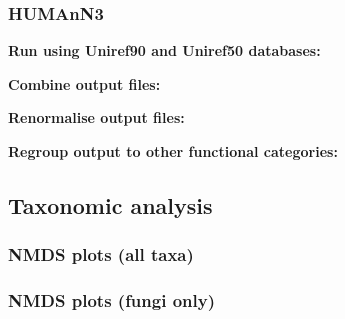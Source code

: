 \documentclass[
]{article}
\newenvironment{Shaded}{\begin{snugshade}}{\end{snugshade}}
\begin{document}
\hypertarget{humann3}{%
\subsubsection{HUMAnN3}\label{humann3}}

\textbf{Run using Uniref90 and Uniref50 databases:}

\begin{Shaded}
\begin{Highlighting}[]

\end{Highlighting}
\end{Shaded}

\textbf{Combine output files:}

\begin{Shaded}
\begin{Highlighting}[]

\end{Highlighting}
\end{Shaded}

\textbf{Renormalise output files:}

\begin{Shaded}
\begin{Highlighting}[]

\end{Highlighting}
\end{Shaded}

\textbf{Regroup output to other functional categories:}

\begin{Shaded}
\begin{Highlighting}[]

\end{Highlighting}
\end{Shaded}

\hypertarget{taxonomic-analysis}{%
\subsection{Taxonomic analysis}\label{taxonomic-analysis}}

\hypertarget{nmds-plots-all-taxa}{%
\subsubsection{NMDS plots (all taxa)}\label{nmds-plots-all-taxa}}

\hypertarget{nmds-plots-fungi-only}{%
\subsubsection{NMDS plots (fungi only)}\label{nmds-plots-fungi-only}}
\end{document}
